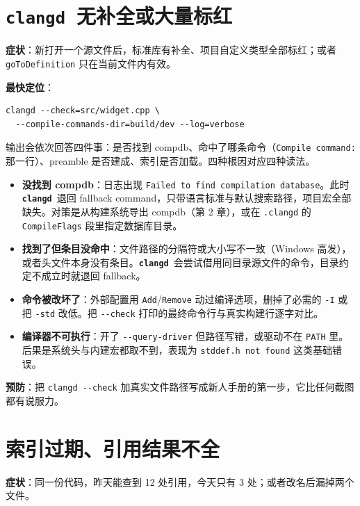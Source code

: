 \documentclass[12pt,a4paper,fontset=fandol]{ctexbook}
\newcommand{\Opt}[1]{\texttt{-\/-#1}}
\newcommand{\Bk}{\discretionary{}{}{}}
\newcommand{\Lib}[1]{\textbf{\texttt{#1}}}
\newcommand{\CD}{\Lib{clangd}}
\begin{document}
\section{\CD\ 无补全或大量标红}\label{sec:ch17-s2}

\textbf{症状}：新打开一个源文件后，标准库有补全、项目自定义类型全部标红；或者 \texttt{goToDefinition} 只在当前文件内有效。

\textbf{最快定位}：

\begin{lstlisting}[style=shellstyle,caption={用 clangd --check 一次看清四层状态}]
clangd --check=src/widget.cpp \
  --compile-commands-dir=build/dev --log=verbose
\end{lstlisting}

输出会依次回答四件事：是否找到 compdb、命中了哪条命令（\texttt{Compile command:} 那一行）、preamble 是否建成、索引是否加载。四种根因对应四种读法。

\begin{itemize}
  \item \textbf{没找到 compdb}：日志出现 \texttt{Failed to find compilation database}。此时 \CD\ 退回 fallback command，只带语言标准与默认搜索路径，项目宏全部缺失。对策是从构建系统导出 compdb（第 2 章），或在 \texttt{.clangd} 的 \texttt{CompileFlags} 段里指定数据库目录。
  \item \textbf{找到了但条目没命中}：文件路径的分隔符或大小写不一致（Windows 高发），或者头文件本身没有条目。\CD\ 会尝试借用同目录源文件的命令，目录约定不成立时就退回 fallback。
  \item \textbf{命令被改坏了}：外部配置用 \texttt{Add}/{\Bk}\texttt{Remove} 动过编译选项，删掉了必需的 \texttt{-I} 或把 \texttt{-std} 改低。把 \Opt{check} 打印的最终命令行与真实构建行逐字对比。
  \item \textbf{编译器不可执行}：开了 \Opt{query-driver} 但路径写错，或驱动不在 \texttt{PATH} 里。后果是系统头与内建宏都取不到，表现为 \texttt{stddef.h not found} 这类基础错误。
\end{itemize}

\textbf{预防}：把 \texttt{clangd}~\Opt{check} 加真实文件路径写成新人手册的第一步，它比任何截图都有说服力。

\section{索引过期、引用结果不全}\label{sec:ch17-s3}

\textbf{症状}：同一份代码，昨天能查到 12 处引用，今天只有 3 处；或者改名后漏掉两个文件。
\end{document}
